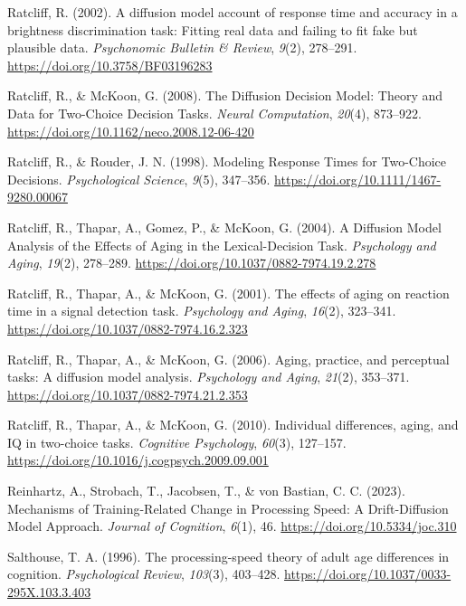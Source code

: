 \documentclass[
  man, donotrepeattitle,floatsintext]{apa6}
\newlength{\cslhangindent}
\newenvironment{CSLReferences}[2] %
 {\begin{list}{}{%
  \setlength{\itemindent}{0pt}
  \setlength{\leftmargin}{0pt}
  \setlength{\parsep}{0pt}
  \ifodd #1
   \setlength{\leftmargin}{\cslhangindent}
   \setlength{\itemindent}{-1\cslhangindent}
  \fi
  \setlength{\itemsep}{#2\baselineskip}}}
 {\end{list}}
\begin{document}
\begin{CSLReferences}{1}{0}
Ratcliff, R. (2002). A diffusion model account of response time and accuracy in a brightness discrimination task: {Fitting} real data and failing to fit fake but plausible data. \emph{Psychonomic Bulletin \& Review}, \emph{9}(2), 278--291. \url{https://doi.org/10.3758/BF03196283}

Ratcliff, R., \& McKoon, G. (2008). The {Diffusion Decision Model}: {Theory} and {Data} for {Two-Choice Decision Tasks}. \emph{Neural Computation}, \emph{20}(4), 873--922. \url{https://doi.org/10.1162/neco.2008.12-06-420}

Ratcliff, R., \& Rouder, J. N. (1998). Modeling {Response Times} for {Two-Choice Decisions}. \emph{Psychological Science}, \emph{9}(5), 347--356. \url{https://doi.org/10.1111/1467-9280.00067}

Ratcliff, R., Thapar, A., Gomez, P., \& McKoon, G. (2004). A {Diffusion Model Analysis} of the {Effects} of {Aging} in the {Lexical-Decision Task}. \emph{Psychology and Aging}, \emph{19}(2), 278--289. \url{https://doi.org/10.1037/0882-7974.19.2.278}

Ratcliff, R., Thapar, A., \& McKoon, G. (2001). The effects of aging on reaction time in a signal detection task. \emph{Psychology and Aging}, \emph{16}(2), 323--341. \url{https://doi.org/10.1037/0882-7974.16.2.323}

Ratcliff, R., Thapar, A., \& McKoon, G. (2006). Aging, practice, and perceptual tasks: {A} diffusion model analysis. \emph{Psychology and Aging}, \emph{21}(2), 353--371. \url{https://doi.org/10.1037/0882-7974.21.2.353}

Ratcliff, R., Thapar, A., \& McKoon, G. (2010). Individual differences, aging, and {IQ} in two-choice tasks. \emph{Cognitive Psychology}, \emph{60}(3), 127--157. \url{https://doi.org/10.1016/j.cogpsych.2009.09.001}

Reinhartz, A., Strobach, T., Jacobsen, T., \& von Bastian, C. C. (2023). Mechanisms of {Training-Related Change} in {Processing Speed}: {A Drift-Diffusion Model Approach}. \emph{Journal of Cognition}, \emph{6}(1), 46. \url{https://doi.org/10.5334/joc.310}

Salthouse, T. A. (1996). The processing-speed theory of adult age differences in cognition. \emph{Psychological Review}, \emph{103}(3), 403--428. \url{https://doi.org/10.1037/0033-295X.103.3.403}


\end{CSLReferences}
\end{document}
